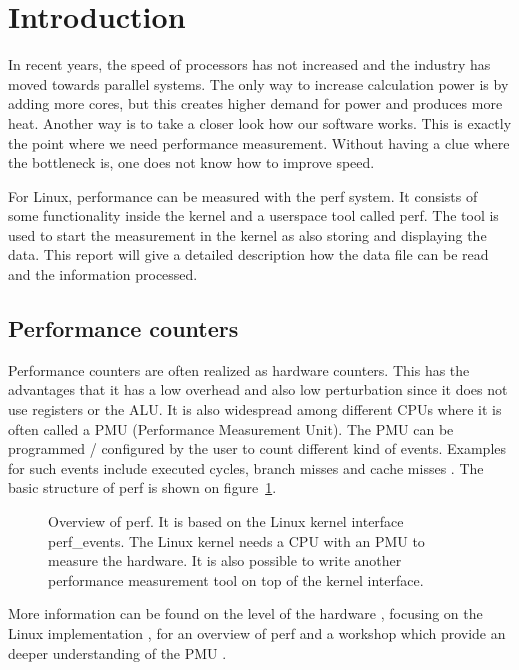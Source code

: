 \section{Introduction}
In recent years, the speed of processors has not increased and the industry has moved towards parallel systems. The only way to increase calculation power is by adding more cores, but this creates higher demand for power and produces more heat. Another way is to take a closer look how our software works. This is exactly the point where we need performance measurement. Without having a clue where the bottleneck is, one does not know how to improve speed. \cite{Jarp2010}

For Linux, performance can be measured with the perf \cite{kernel.org2011} system. It consists of some functionality inside the kernel and a userspace tool called perf. The tool is used to start the measurement in the kernel as also storing and displaying the data. This report will give a detailed description how the data file can be read and the information processed.

\subsection{Performance counters}
Performance counters are often realized as hardware counters. This has the advantages that it has a low overhead and also low perturbation since it does not use registers or the ALU. It is also widespread among different CPUs where it is often called a PMU (Performance Measurement Unit). The PMU can be programmed / configured by the user to count different kind of events. Examples for such events include executed cycles, branch misses and cache misses \cite{Azimi2009}. The basic structure of perf is shown on figure~\ref{fig:perfOverview}.

\begin{figure}[b]
  \center
  
  \caption[Overview of perf]{Overview of perf. It is based on the Linux kernel interface perf\_events. The Linux kernel needs a CPU with an PMU to measure the hardware. It is also possible to write another performance measurement tool on top of the kernel interface.\label{fig:perfOverview}}
\end{figure}

More information can be found on the level of the hardware \cite{Weaver2011}, focusing on the Linux implementation \cite{Eranian2010}, for an overview of perf \cite{Melo2010} and a workshop which provide an deeper understanding of the PMU \cite{Nowak2011}.

